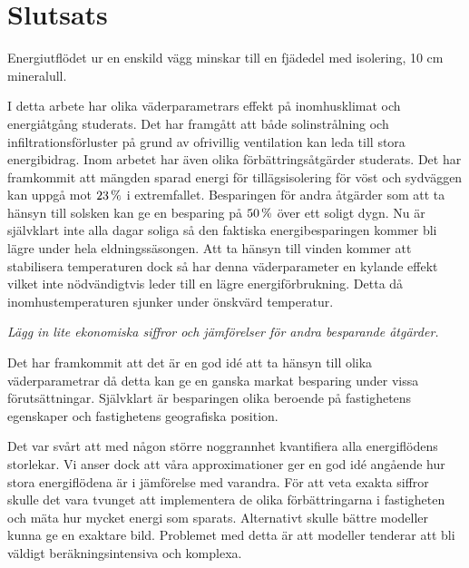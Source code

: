 \chapter{Slutsats}

Energiutflödet ur en enskild vägg minskar till en fjädedel med isolering, 10 cm mineralull.



I detta arbete har olika väderparametrars effekt på inomhusklimat och energiåtgång studerats.
Det har framgått att både solinstrålning och infiltrationsförluster på grund av ofrivillig
ventilation kan leda till stora energibidrag. Inom arbetet har även olika förbättringsåtgärder
studerats. Det har framkommit att mängden sparad energi för tillägsisolering för vöst och sydväggen
kan uppgå mot $\unit[23]{\%}$ i extremfallet. Besparingen för andra åtgärder som att ta hänsyn till solsken
kan ge en besparing på $\unit[50]{\%}$ över ett soligt dygn.  Nu är självklart inte alla dagar soliga
så den faktiska energibesparingen kommer bli lägre under hela eldningssäsongen.
Att ta hänsyn till vinden kommer att stabilisera
temperaturen dock så har denna väderparameter en kylande effekt vilket inte nödvändigtvis leder
till en lägre energiförbrukning. Detta då inomhustemperaturen sjunker under önskvärd temperatur. 

\emph{\color{red} Lägg in lite ekonomiska siffror och jämförelser för andra besparande åtgärder.}

Det har framkommit att det är en god idé att ta hänsyn till olika väderparametrar då
detta kan ge en ganska markat besparing under vissa förutsättningar. Självklart är
besparingen olika beroende på fastighetens egenskaper och fastighetens geografiska position.

Det var svårt att med någon större noggrannhet kvantifiera alla energiflödens storlekar. Vi
anser dock att våra approximationer ger en god idé angående hur stora energiflödena är i jämförelse
med varandra. För att veta exakta siffror skulle det vara tvunget att implementera de olika
förbättringarna i fastigheten och mäta hur mycket energi som sparats. Alternativt skulle
bättre modeller kunna ge en exaktare bild. Problemet med detta är att modeller tenderar att
bli väldigt beräkningsintensiva och komplexa.

